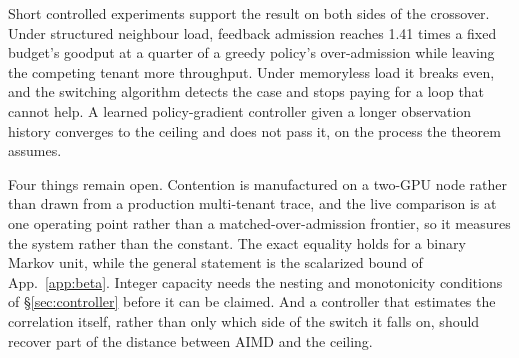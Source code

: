 \documentclass[10pt,conference,letterpaper]{IEEEtran}
\theoremstyle{remark}\newtheorem{remark}{Remark}
\begin{document}
Short controlled experiments support the result on both sides of the crossover.
Under structured neighbour load, feedback admission reaches 1.41 times a fixed
budget's goodput at a quarter of a greedy policy's over-admission while leaving
the competing tenant more throughput. Under memoryless load it breaks even, and
the switching algorithm detects the case and stops paying for a loop that cannot
help. A learned policy-gradient controller given a longer observation history converges
to the ceiling and does not pass it, on the process the theorem assumes.

Four things remain open. Contention is manufactured on a two-GPU node rather than
drawn from a production multi-tenant trace, and the live comparison is at one
operating point rather than a matched-over-admission frontier, so it measures the
system rather than the constant. The exact equality holds for a binary Markov
unit, while the general statement is the scalarized bound of
App.~\ref{app:beta}. Integer capacity needs the nesting and monotonicity
conditions of \S\ref{sec:controller} before it can be claimed. And a controller
that estimates the correlation itself, rather than only which side of the switch it
falls on, should recover part of the distance between AIMD and the ceiling.

\appendices




\end{document}
